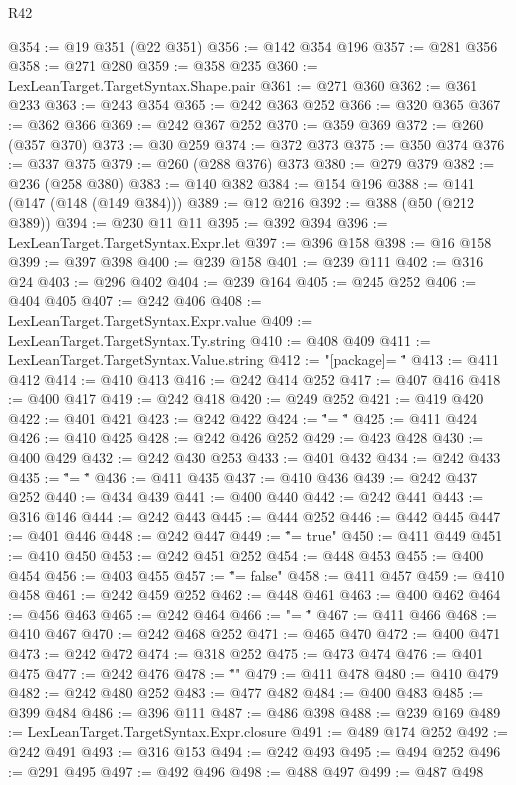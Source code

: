 \begin{lexlean}{R42}
\begin{coremodule}
@354 := @19 @351 (@22 @351)
@356 := @142 @354 @196
@357 := @281 @356
@358 := @271 @280
@359 := @358 @235
@360 := LexLeanTarget.TargetSyntax.Shape.pair
@361 := @271 @360
@362 := @361 @233
@363 := @243 @354
@365 := @242 @363 @252
@366 := @320 @365
@367 := @362 @366
@369 := @242 @367 @252
@370 := @359 @369
@372 := @260 (@357 @370)
@373 := @30 @259
@374 := @372 @373
@375 := @350 @374
@376 := @337 @375
@379 := @260 (@288 @376) @373
@380 := @279 @379
@382 := @236 (@258 @380)
@383 := @140 @382
@384 := @154 @196
@388 := @141 (@147 (@148 (@149 @384)))
@389 := @12 @216
@392 := @388 (@50 (@212 @389))
@394 := @230 @11 @11
@395 := @392 @394
@396 := LexLeanTarget.TargetSyntax.Expr.let
@397 := @396 @158
@398 := @16 @158
@399 := @397 @398
@400 := @239 @158
@401 := @239 @111
@402 := @316 @24
@403 := @296 @402
@404 := @239 @164
@405 := @245 @252
@406 := @404 @405
@407 := @242 @406
@408 := LexLeanTarget.TargetSyntax.Expr.value
@409 := LexLeanTarget.TargetSyntax.Ty.string
@410 := @408 @409
@411 := LexLeanTarget.TargetSyntax.Value.string
@412 := "[package]\nname = \""
@413 := @411 @412
@414 := @410 @413
@416 := @242 @414 @252
@417 := @407 @416
@418 := @400 @417
@419 := @242 @418
@420 := @249 @252
@421 := @419 @420
@422 := @401 @421
@423 := @242 @422
@424 := "\"\nversion = \""
@425 := @411 @424
@426 := @410 @425
@428 := @242 @426 @252
@429 := @423 @428
@430 := @400 @429
@432 := @242 @430 @253
@433 := @401 @432
@434 := @242 @433
@435 := "\"\nedition = \""
@436 := @411 @435
@437 := @410 @436
@439 := @242 @437 @252
@440 := @434 @439
@441 := @400 @440
@442 := @242 @441
@443 := @316 @146
@444 := @242 @443
@445 := @444 @252
@446 := @442 @445
@447 := @401 @446
@448 := @242 @447
@449 := "\"\npublish = true"
@450 := @411 @449
@451 := @410 @450
@453 := @242 @451 @252
@454 := @448 @453
@455 := @400 @454
@456 := @403 @455
@457 := "\"\npublish = false"
@458 := @411 @457
@459 := @410 @458
@461 := @242 @459 @252
@462 := @448 @461
@463 := @400 @462
@464 := @456 @463
@465 := @242 @464
@466 := "\n\n[lib]\npath = \""
@467 := @411 @466
@468 := @410 @467
@470 := @242 @468 @252
@471 := @465 @470
@472 := @400 @471
@473 := @242 @472
@474 := @318 @252
@475 := @473 @474
@476 := @401 @475
@477 := @242 @476
@478 := "\"\n{}\n"
@479 := @411 @478
@480 := @410 @479
@482 := @242 @480 @252
@483 := @477 @482
@484 := @400 @483
@485 := @399 @484
@486 := @396 @111
@487 := @486 @398
@488 := @239 @169
@489 := LexLeanTarget.TargetSyntax.Expr.closure
@491 := @489 @174 @252
@492 := @242 @491
@493 := @316 @153
@494 := @242 @493
@495 := @494 @252
@496 := @291 @495
@497 := @492 @496
@498 := @488 @497
@499 := @487 @498

\end{coremodule}
\end{lexlean}
